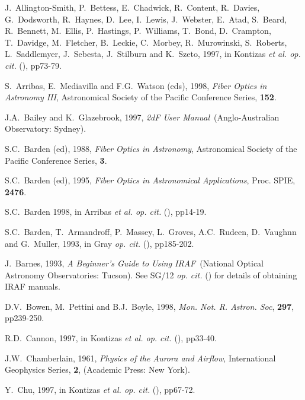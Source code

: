 \documentclass[twoside,11pt]{article}
\newcommand{\xref}[3]{#1}
\begin{document}
\newpage
{}
\begin{thebibliography}{99}

   J.~Allington-Smith, P.~Bettess, E.~Chadwick,
   R.~Content, R.~Davies, G.~Dodsworth, R.~Haynes, D.~Lee, I.~Lewis,
   J.~Webster, E.~Atad, S.~Beard, R.~Bennett, M.~Ellis, P.~Hastings,
   P.~Williams, T.~Bond, D.~Crampton, T.~Davidge, M.~Fletcher,
   B.~Leckie, C.~Morbey, R.~Murowinski, S.~Roberts, L.~Saddlemyer,
   J.~Sebesta, J.~Stilburn and K.~Szeto, 1997, in Kontizas {\it et al.
   op. cit.}\/ (\cite{KONTIZAS97}), pp73-79.

   S.~Arribas, E.~Mediavilla and F.G.~Watson (eds),
   1998, {\it Fiber Optics in Astronomy III}, Astronomical Society of
   the Pacific Conference Series, {\bf 152}.

   J.A.~Bailey and K.~Glazebrook, 1997, {\it 2dF
   User Manual}\, (Anglo-Australian Observatory: Sydney).

   S.C.~Barden (ed), 1988, {\it Fiber Optics in
   Astronomy}, Astronomical Society of the Pacific Conference Series,
   {\bf 3}.

   S.C.~Barden (ed), 1995, {\it Fiber Optics in
   Astronomical Applications}, Proc. SPIE, {\bf 2476}.

   S.C.~Barden 1998, in Arribas {\it et al. op. cit.}\/
   (\cite{ARRIBAS98}), pp14-19.

   S.C.~Barden, T.~Armandroff, P.~Massey, L.~Groves,
   A.C.~Rudeen, D.~Vaughnn and G.~Muller, 1993, in Gray {\it op. cit.}\/
   (\cite{GRAY93}), pp185-202.

   J.~Barnes, 1993, {\it A Beginner's Guide to
   Using IRAF}\, (National Optical Astronomy Observatories: Tucson).
   See \xref{SG/12}{sg12}{} {\it op. cit.}\/ (\cite{SG12}) for details of
   obtaining IRAF manuals.

   D.V.~Bowen, M.~Pettini and B.J.~Boyle, 1998,
   {\it Mon. Not. R. Astron. Soc}, {\bf 297}, pp239-250.

   R.D.~Cannon, 1997, in Kontizas {\it et al.
   op. cit.}\/ (\cite{KONTIZAS97}), pp33-40.

   J.W.~Chamberlain, 1961, {\it Physics of the
   Aurora and Airflow}, International Geophysics Series, {\bf 2},
   (Academic Press: New York).

   Y.~Chu, 1997, in Kontizas {\it et al. op. cit.}\/
   (\cite{KONTIZAS97}), pp67-72.


\end{thebibliography}
\end{document}
